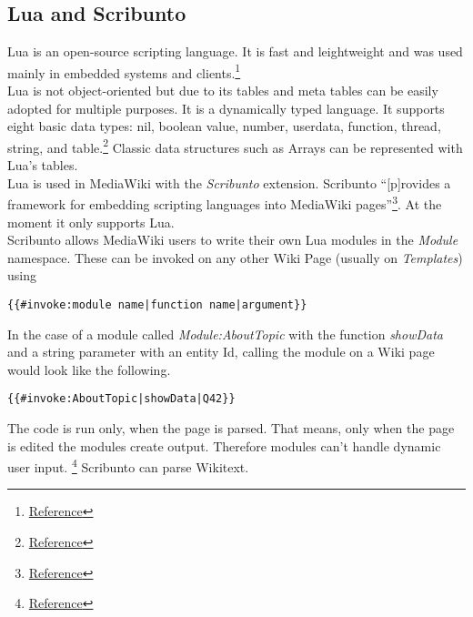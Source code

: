 \subsection{Lua and Scribunto}

Lua is an open-source scripting language. It is fast and leightweight and was used mainly in embedded systems and clients.\footnote{\href{http://www.lua.org/about.html}{Reference}} \\
Lua is not object-oriented but due to its tables and meta tables can be easily adopted for multiple purposes. It is a dynamically typed language. It supports eight basic data types: nil, boolean value, number, userdata, function, thread, string, and table.\footnote{\href{http://www.lua.org/pil/2.html}{Reference}} Classic data structures such as Arrays can be represented with Lua's tables. \\
Lua is used in MediaWiki with the \textit{Scribunto} extension. Scribunto ``[p]rovides a framework for embedding scripting languages into MediaWiki pages''\footnote{\href{https://www.mediawiki.org/wiki/Extension:Scribunto}{Reference}}. At the moment it only supports Lua. \\
Scribunto allows MediaWiki users to write their own Lua modules in the \textit{Module} namespace. These can be invoked on any other Wiki Page (usually on \textit{Templates}) using \\
\begin{lstlisting}[frame=single] 
{{#invoke:module name|function name|argument}}
\end{lstlisting}

In the case of a module called \textit{Module:AboutTopic} with the function \textit{showData} and a string parameter with an entity Id, calling the module on a Wiki page would look like the following. \\
\begin{lstlisting}[frame=single] 
{{#invoke:AboutTopic|showData|Q42}}
\end{lstlisting}

The code is run only, when the page is parsed. That means, only when the page is edited the modules create output. Therefore modules can't handle dynamic user input. \footnote{\href{https://en.wikipedia.org/wiki/Wikipedia:Lua}{Reference}} Scribunto can parse Wikitext. 

